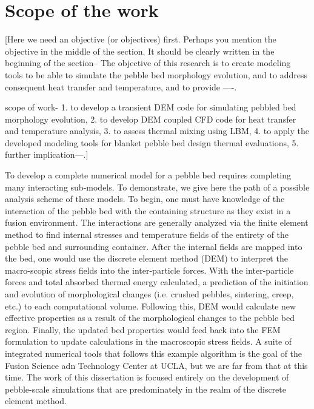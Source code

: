 \section{Scope of the work}\label{sec:intro-scope-of-work}
[Here we need an objective (or objectives) first. Perhaps you mention the objective in the middle of the section. It should be clearly written in the beginning of the section-- The objective of this research is to create modeling tools to be able to simulate the pebble bed morphology evolution, and to address consequent heat transfer and temperature, and to provide ----. 

scope of work- 1. to develop a transient DEM code for simulating pebbled bed morphology evolution, 2. to develop DEM coupled CFD code for heat transfer and temperature analysis, 3. to assess thermal mixing using LBM, 4. to apply the developed modeling tools for blanket pebble bed design thermal evaluations, 5. further implication---.]




To develop a complete numerical model for a pebble bed requires completing many interacting sub-models. To demonstrate, we give here the path of a possible analysis scheme of these models. To begin, one must have knowledge of the interaction of the pebble bed with the containing structure as they exist in a fusion environment. The interactions are generally analyzed via the finite element method to find internal stresses and temperature fields of the entirety of the pebble bed and surrounding container. After the internal fields are mapped into the bed, one would use the discrete element method (DEM) to interpret the macro-scopic stress fields into the inter-particle forces. With the inter-particle forces and total absorbed thermal energy calculated, a prediction of the initiation and evolution of morphological changes (i.e. crushed pebbles, sintering, creep, etc.) to each computational volume. Following this, DEM would calculate new effective properties as a result of the morphological changes to the pebble bed region. Finally, the updated bed properties would feed back into the FEM formulation to update calculations in the macroscopic stress fields. A suite of integrated numerical tools that follows this example algorithm is the goal of the Fusion Science adn Technology Center at UCLA, but we are far from that at this time. The work of this dissertation is focused entirely on the development of pebble-scale simulations that are predominately in the realm of the discrete element method.

